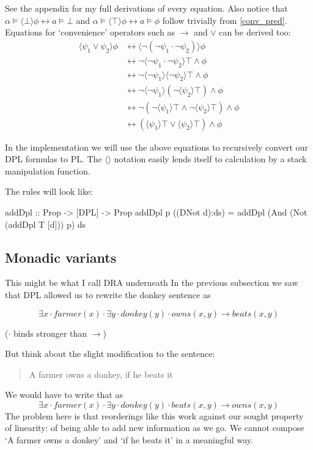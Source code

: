 \documentclass[12pt]{article}
\begin{document}
See the appendix for my full derivations of every equation. Also notice that $\alpha\models\langle\bot\rangle\phi\leftrightarrow a\models\bot$ and $\alpha\models\langle\top\rangle\phi\leftrightarrow a\models\phi$ follow trivially from \eqref{conv_pred}. Equations for `convenience' operators such as $\rightarrow$ and $\vee$ can be derived too:
\begin{align}
\langle\psi_1\vee\psi_2\rangle\phi
& \leftrightarrow \langle\neg(\neg\psi_1\cdot\neg\psi_2)\rangle\phi \nonumber\\
& \leftrightarrow \neg\langle\neg\psi_1\cdot\neg\psi_2\rangle\top \wedge\phi \nonumber\\
& \leftrightarrow \neg\langle\neg\psi_1\rangle\langle\neg\psi_2\rangle\top \wedge\phi \nonumber\\
& \leftrightarrow \neg\langle\neg\psi_1\rangle(\neg\langle\psi_2\rangle\top) \wedge\phi \nonumber\\
& \leftrightarrow \neg(\neg\langle\psi_1\rangle\top \wedge \neg\langle\psi_2\rangle\top) \wedge\phi \nonumber\\
& \leftrightarrow (\langle\psi_1\rangle\top \vee \langle\psi_2\rangle\top) \wedge\phi \label{conv_vee}
\end{align}

In the implementation we will use the above equations to recursively convert our DPL formulas to PL. The $\langle\rangle$ notation easily lends itself to calculation by a stack manipulation function.

The rules will look like:
\begin{haskell}
addDpl :: Prop -> [DPL] -> Prop
addDpl p ((DNot d):ds) = addDpl (And (Not (addDpl T [d])) p) ds
\end{haskell}


\subsection{Monadic variants}
This might be what I call DRA underneath
In the previous subsection we saw that DPL allowed us to rewrite the donkey sentence as 

\begin{equation}
\exists x \cdot farmer(x) \cdot \exists y \cdot donkey(y) \cdot owns(x,y) \rightarrow beats(x,y)
\end{equation}

($\cdot$ binds stronger than $\rightarrow$)

But think about the slight modification to the sentence:
%
\begin{quotation}
A farmer owns a donkey, if he beats it
\end{quotation}
%
We would have to write that as
%
\begin{equation}
\exists x \cdot farmer(x) \cdot \exists y \cdot donkey(y) \cdot beats(x,y) \rightarrow owns(x,y)
\end{equation}
%
The problem here is that reorderings like this work against our sought property of linearity: of being able to add new information as we go. We cannot compose `A farmer owns a donkey' and `if he beats it' in a meaningful way.
\end{document}
